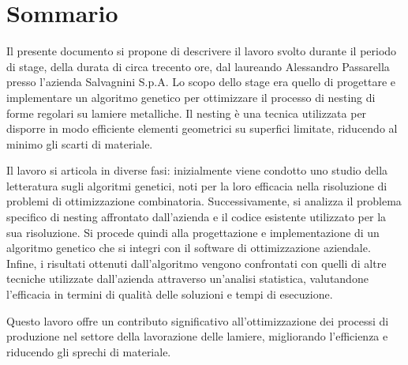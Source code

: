 \cleardoublepage
{}
{}
\begingroup
\let\clearpage\relax
\let\cleardoublepage\relax
\let\cleardoublepage\relax

\chapter*{Sommario}

Il presente documento si propone di descrivere il lavoro svolto durante il periodo di stage, della durata di circa trecento ore, dal laureando Alessandro Passarella presso l'azienda Salvagnini S.p.A. Lo scopo dello stage era quello di progettare e implementare un algoritmo genetico per ottimizzare il processo di nesting di forme regolari su lamiere metalliche. Il nesting è una tecnica utilizzata per disporre in modo efficiente elementi geometrici su superfici limitate, riducendo al minimo gli scarti di materiale. 

Il lavoro si articola in diverse fasi: inizialmente viene condotto uno studio della letteratura sugli algoritmi genetici, noti per la loro efficacia nella risoluzione di problemi di ottimizzazione combinatoria. Successivamente, si analizza il problema specifico di nesting affrontato dall'azienda e il codice esistente utilizzato per la sua risoluzione. Si procede quindi alla progettazione e implementazione di un algoritmo genetico che si integri con il software di ottimizzazione aziendale. Infine, i risultati ottenuti dall'algoritmo vengono confrontati con quelli di altre tecniche utilizzate dall'azienda attraverso un'analisi statistica, valutandone l'efficacia in termini di qualità delle soluzioni e tempi di esecuzione.

Questo lavoro offre un contributo significativo all'ottimizzazione dei processi di produzione nel settore della lavorazione delle lamiere, migliorando l'efficienza e riducendo gli sprechi di materiale.




\endgroup

\vfill
